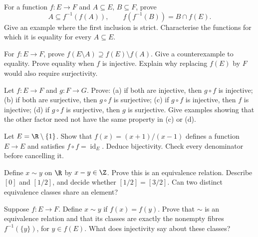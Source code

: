 \begin{exercise}[$\star\star$]\label{ex:lang-inverseimage}
For a function $f:E\to F$ and $A\subseteq E$, $B\subseteq F$, prove
\[
A\subseteq f^{-1}(f(A)),\qquad f(f^{-1}(B))=B\cap f(E).
\]
Give an example where the first inclusion is strict. Characterise the functions
for which it is equality for every $A\subseteq E$.
\end{exercise}

\begin{exercise}[$\star\star$]\label{ex:lang-complement}
For $f:E\to F$, prove $f(E\setminus A)\supseteq f(E)\setminus f(A)$.
Give a counterexample to equality. Prove equality when $f$ is injective.
Explain why replacing $f(E)$ by $F$ would also require surjectivity.
\end{exercise}

\begin{exercise}[$\star\star$]\label{ex:lang-composition}
Let $f:E\to F$ and $g:F\to G$. Prove:
(a) if both are injective, then $g\circ f$ is injective;
(b) if both are surjective, then $g\circ f$ is surjective;
(c) if $g\circ f$ is injective, then $f$ is injective;
(d) if $g\circ f$ is surjective, then $g$ is surjective.
Give examples showing that the other factor need not have the same property in (c) or (d).
\end{exercise}

\begin{exercise}[$\star\star$]\label{ex:lang-selfinverse}
Let $E=\R\setminus\{1\}$. Show that $f(x)=(x+1)/(x-1)$ defines a function
$E\to E$ and satisfies $f\circ f=\operatorname{id}_E$.
Deduce bijectivity. Check every denominator before cancelling it.
\end{exercise}

\begin{exercise}[$\star\star$]\label{ex:lang-equivalence}
Define $x\sim y$ on $\R$ by $x-y\in\Z$. Prove this is an equivalence relation.
Describe $[0]$ and $[1/2]$, and decide whether $[1/2]=[3/2]$.
Can two distinct equivalence classes share an element?
\end{exercise}

\begin{exercise}[$\star\star$]\label{ex:lang-partitions}
Suppose $f:E\to F$. Define $x\sim y$ if $f(x)=f(y)$.
Prove that $\sim$ is an equivalence relation and that its classes are exactly
the nonempty fibres $f^{-1}(\{y\})$, for $y\in f(E)$.
What does injectivity say about these classes?
\end{exercise}

